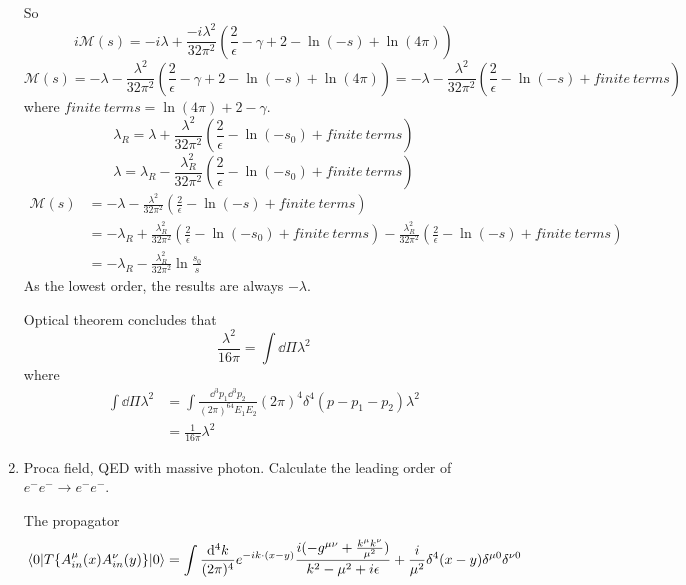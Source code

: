 \documentclass{article}
\newcommand{\g}{\gamma}
\newcommand{\la}{\lambda}
\begin{document}
\begin{enumerate}[\bf 1.]
So
$$i\mathcal{M}(s)=-i\la+\frac{-i\la^2}{32\pi^2}(\frac{2}{\epsilon}-\g+2-\ln(-s)+\ln(4\pi))$$
$$\mathcal{M}(s)=-\la-\frac{\la^2}{32\pi^2}(\frac{2}{\epsilon}-\g+2-\ln(-s)+\ln(4\pi))=-\la-\frac{\la^2}{32\pi^2}(\frac{2}{\epsilon}-\ln(-s)+finite\ terms)$$
where $finite\ terms=\ln(4\pi)+2-\g$.
$$\la_R=\la+\frac{\la^2}{32\pi^2}(\frac{2}{\epsilon}-\ln(-s_0)+finite\ terms)$$
$$\la=\la_R-\frac{\la_R^2}{32\pi^2}(\frac{2}{\epsilon}-\ln(-s_0)+finite\ terms)$$
\begin{align*}
  \mathcal{M}(s)&=-\la-\frac{\lambda^2}{32\pi^2}(\frac{2}{\epsilon}-\ln{(-s)}+finite\ terms)\\
  &=-\la_R+\frac{\la_R^2}{32\pi^2}(\frac{2}{\epsilon}-\ln{(-s_0)}+finite\ terms)-\frac{\lambda_R^2}{32\pi^2}(\frac{2}{\epsilon}-\ln{(-s)}+finite\ terms)\\
  &=-\la_R-\frac{\la_R^2}{32\pi^2}\ln{\frac{s_0}{s}}
\end{align*}
As the lowest order, the results are always $-\la$.

Optical theorem concludes that 
$$\frac{\la^2}{16\pi}=\int\dd\Pi\la^2$$
where
\begin{align*}
  \int\dd\Pi\la^2&=\int\frac{\dd^3p_1\dd^3p_2}{(2\pi)^64E_1E_2}(2\pi)^4\delta^4(p-p_1-p_2)\la^2\\
  &=\frac{1}{16\pi}\la^2
\end{align*}

  \item Proca field, QED with massive photon. Calculate the leading order of $e^-e^-\rightarrow e^-e^-$.

	The propagator
	$$\mel{0}{T\{A_{in}^{\mu}(x)A_{in}^{\nu}(y)\}}{0}=\int\frac{\dd^4k}{(2\pi)^4}e^{-ik\cdot (x-y)}\frac{i(-g^{\mu\nu}+\frac{k^{\mu}k^{\nu}}{\mu^2})}{k^2-\mu^2+i\epsilon}+\frac{i}{\mu^2}\delta^4(x-y)\delta^{\mu0}\delta^{\nu0}$$


\end{enumerate}
\end{document}

